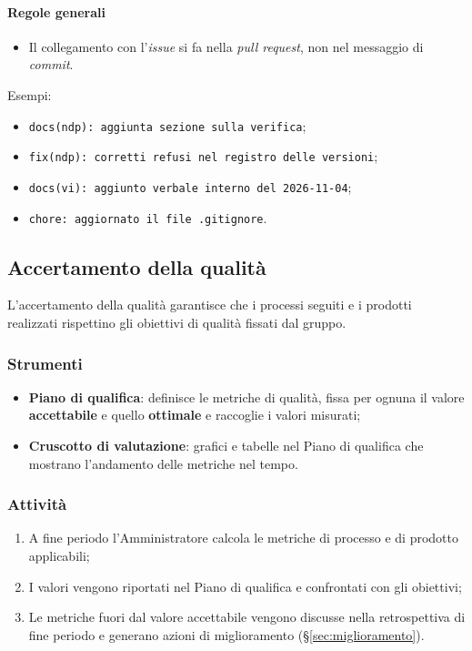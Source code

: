 \documentclass[12pt,a4paper]{article}
\newcommand{\tightlist}{\setlength{\itemsep}{1pt}\setlength{\parskip}{0pt}}
\begin{document}
\paragraph{Regole generali}
\begin{itemize}
\tightlist
\item Il collegamento con l'\emph{issue} si fa nella \emph{pull request}, non nel messaggio di \emph{commit}.
\end{itemize}

Esempi:
\begin{itemize}
\tightlist
\item \texttt{docs(ndp): aggiunta sezione sulla verifica};
\item \texttt{fix(ndp): corretti refusi nel registro delle versioni};
\item \texttt{docs(vi): aggiunto verbale interno del 2026-11-04};
\item \texttt{chore: aggiornato il file .gitignore}.
\end{itemize}

\subsection{Accertamento della qualità}\label{sec:qualita}
L'accertamento della qualità garantisce che i processi seguiti e i prodotti realizzati rispettino gli obiettivi di qualità fissati dal gruppo.

\subsubsection{Strumenti}
\begin{itemize}
\tightlist
\item \textbf{Piano di qualifica}: definisce le metriche di qualità, fissa per ognuna il valore \textbf{accettabile} e quello \textbf{ottimale} e raccoglie i valori misurati;
\item \textbf{Cruscotto di valutazione}: grafici e tabelle nel Piano di qualifica che mostrano l'andamento delle metriche nel tempo.
\end{itemize}

\subsubsection{Attività}
\begin{enumerate}
\tightlist
\item A fine periodo l'Amministratore calcola le metriche di processo e di prodotto applicabili;
\item I valori vengono riportati nel Piano di qualifica e confrontati con gli obiettivi;
\item Le metriche fuori dal valore accettabile vengono discusse nella retrospettiva di fine periodo e generano azioni di miglioramento (§\ref{sec:miglioramento}).
\end{enumerate}
\end{document}

